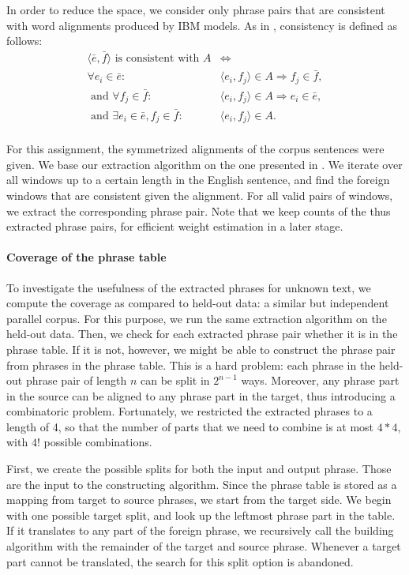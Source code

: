 \documentclass[11pt]{article}
\begin{document}
In order to reduce the space, we consider only phrase pairs that are consistent with word alignments produced by IBM models.
As in \cite{Koehn:2010}, consistency is defined as follows:
\begin{align*}
\langle \bar{e},\bar{f}\rangle\text{ is consistent with }A &\Leftrightarrow\\
\forall e_i\in \bar{e}: &\langle e_i,f_j\rangle \in A \Rightarrow f_j \in \bar{f}, \\
\text{ and }\forall f_j\in \bar{f}: &\langle e_i,f_j\rangle \in A \Rightarrow e_i \in \bar{e}, \\
\text{ and }\exists e_i \in \bar{e}, f_j\in \bar{f}: &\langle e_i,f_j\rangle \in A.\\
\end{align*}

For this assignment, the symmetrized alignments of the corpus sentences were given. 
We base our extraction algorithm on the one presented in \cite[page 133]{Koehn:2010}.
We iterate over all windows up to a certain length in the English sentence, and find the foreign windows that are consistent given the alignment. For all valid pairs of windows, we extract the corresponding phrase pair. Note that we keep counts of the thus extracted phrase pairs, for efficient weight estimation in a later stage.

\paragraph{Coverage of the phrase table}
To investigate the usefulness of the extracted phrases for unknown text, we compute the coverage as compared to held-out data: a similar but independent parallel corpus. For this purpose, we run the same extraction algorithm on the held-out data. Then, we check for each extracted phrase pair whether it is in the phrase table. If it is not, however, we might be able to construct the phrase pair from phrases in the phrase table. This is a hard problem: each phrase in the held-out phrase pair of length $n$ can be split in $2^{n-1}$ ways. Moreover, any phrase part in the source can be aligned to any phrase part in the target, thus introducing a combinatoric problem. Fortunately, we restricted the extracted phrases to a length of 4, so that the number of parts that we need to combine is at most $4*4$, with $4!$ possible combinations.


 First, we create the possible splits for both the input and output phrase. Those are the input to the constructing algorithm.
Since the phrase table is stored as a mapping from target to source phrases, we start from the target side. 
We begin with one possible target split, and look up the leftmost phrase part in the table. If it translates to any part of the foreign phrase, we recursively call the building algorithm with the remainder of the target and source phrase. Whenever a target part cannot be translated, the search for this split option is abandoned. 
\end{document}
